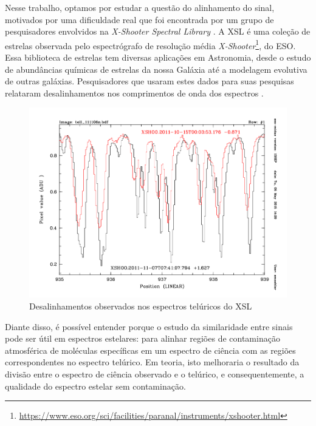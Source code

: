 Nesse trabalho, optamos por estudar a questão do alinhamento do sinal, motivados por uma dificuldade real que foi encontrada por um grupo de pesquisadores envolvidos na \textit{X-Shooter Spectral Library} \citep[][XSL]{Chen2014TheXS}. A XSL é uma coleção de estrelas observada pelo espectrógrafo de resolução média \textit{X-Shooter}\footnote{\url{https://www.eso.org/sci/facilities/paranal/instruments/xshooter.html}}, do ESO. Essa biblioteca de estrelas tem diversas aplicações em Astronomia, desde o estudo de abundâncias químicas de estrelas da nossa Galáxia até a modelagem evolutiva de outras galáxias. Pesquisadores que usaram estes dados para suas pesquisas relataram desalinhamentos nos comprimentos de onda dos espectros \citep{unpublished-xshooter-data-release, wavelength-shifts}.

\begin{figure}[htb]
\centering
\includegraphics[width=12cm]{figuras/xsl-wavelength-shifts.png}
\caption{Desalinhamentos observados nos espectros telúricos do XSL \citep{wavelength-shifts}}
\label{fig:matlab-dtw}
\end{figure}

Diante disso, é possível entender porque o estudo da similaridade entre sinais pode ser útil em espectros estelares: para alinhar regiões de contaminação atmosférica de moléculas específicas em um espectro de ciência com as regiões correspondentes no espectro telúrico. Em teoria, isto melhoraria o resultado da divisão entre o espectro de ciência observado e o telúrico, e consequentemente, a qualidade do espectro estelar sem contaminação.

